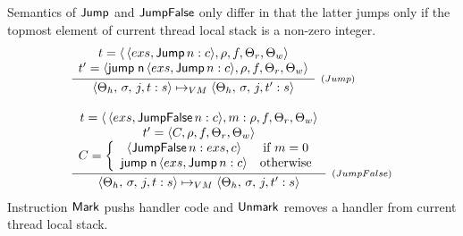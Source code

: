 \documentclass[sigplan, anonymous, review]{acmart}
\theoremstyle{definition}
\newcommand{\C}[1]{\red{\mathsf{#1}}}
\newcommand{\F}[1]{\green{\mathsf{#1}}}
\newcommand{\V}[1]{\black{\mathsf{#1}}}
\begin{document}
Semantics of \ensuremath{\C{Jump}} and \ensuremath{\C{JumpFalse}} only differ in that the latter jumps only if the topmost element of current
thread local stack is a non-zero integer.
\[
  \begin{array}{l}
     \infer[_{(Jump)}]
           {\langle \Theta_h,\,\sigma,\,j,t : s\rangle \mapsto_{VM}
            \langle \Theta_h,\,\sigma,\,j,t' : s\rangle}
           {\begin{array}{c}
              t = \langle\,\langle exs, \ensuremath{\C{Jump}}\,n : c\rangle,\rho, f, \Theta_r,\Theta_w\rangle \\
              t' = \langle \ensuremath{\F{jump}\;\V{n}}\,\langle exs, \ensuremath{\C{Jump}}\,n : c\rangle, \rho, f, \Theta_r,\Theta_w\rangle
            \end{array}} \\ \\
     \infer[_{(JumpFalse)}]
           {\langle \Theta_h,\,\sigma,\,j,t : s\rangle \mapsto_{VM}
            \langle \Theta_h,\,\sigma,\,j,t' : s\rangle}
           {\begin{array}{c}
              t = \langle\,\langle exs, \ensuremath{\C{JumpFalse}}\,n : c\rangle,m:\rho, f, \Theta_r,\Theta_w\rangle \\
              t' = \langle C, \rho, f, \Theta_r,\Theta_w\rangle \\
              C = \left\{ \begin{array}{cc}
                            \langle \ensuremath{\C{JumpFalse}}\, n:exs,c\rangle & \text{if } m = 0\\
                            \ensuremath{\F{jump}\;\V{n}}\,\langle exs, \ensuremath{\C{Jump}}\,n : c\rangle & \text{otherwise}\\
                          \end{array} \right.
            \end{array}}
  \end{array}
\]
Instruction \ensuremath{\C{Mark}} pushs handler code and \ensuremath{\C{Unmark}} removes a handler from current thread local stack.
\end{document}
